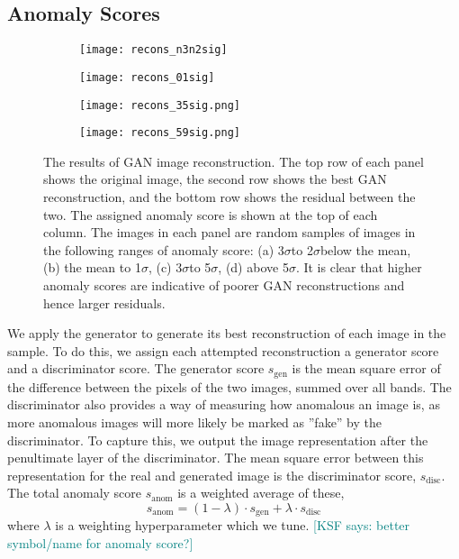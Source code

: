 \documentclass{article}
\newcommand{\sig}{$\sigma$} %
\newcommand{\KSF}[1]{\textcolor{teal}{{[KSF says: #1]}}}
\begin{document}
\subsection{Anomaly Scores}

\begin{figure}
\begin{subfigure}{.5\textwidth}
  \centering
  \texttt{[image: recons\_n3n2sig]}  
  \caption{}
  \label{fig:recon_neg}
\end{subfigure}
\begin{subfigure}{.5\textwidth}
  \centering
  \texttt{[image: recons\_01sig]}  
  \caption{}
  \label{fig:recon_mid}
\end{subfigure}

\begin{subfigure}{.5\textwidth}
  \centering
  \texttt{[image: recons\_35sig.png]}  
  \caption{}
  \label{fig:recon_3sig}
\end{subfigure}
\begin{subfigure}{.5\textwidth}
  \centering
  \texttt{[image: recons\_59sig.png]}  
  \caption{}
  \label{fig:recon_5sig}
\end{subfigure}
\caption{The results of GAN image reconstruction. The top row of each panel shows the original image, the second row shows the best GAN reconstruction, and the bottom row shows the residual between the two. The assigned anomaly score is shown at the top of each column. The images in each panel are random samples of images in the following ranges of anomaly score: (a) 3\sig to 2\sig below the mean, (b) the mean to 1\sig, (c) 3\sig to 5\sig, (d) above 5\sig. It is clear that higher anomaly scores are indicative of poorer GAN reconstructions and hence larger residuals.}
\label{fig:recon}
\end{figure}

We apply the generator to generate its best reconstruction of each image in the sample.
To do this, we assign each attempted reconstruction a generator score and a discriminator score.
The generator score $s_\mathrm{gen}$ is the mean square error of the difference between the pixels of the two images, summed over all bands.
The discriminator also provides a way of measuring how anomalous an image is, as more anomalous images will more likely be marked as ''fake'' by the discriminator.
To capture this, we output the image representation after the penultimate layer of the discriminator. %
The mean square error between this representation for the real and generated image is the discriminator score, $s_\mathrm{disc}$.
The total anomaly score $s_\mathrm{anom}$ is a weighted average of these,
\begin{equation}
s_\mathrm{anom} = (1-\lambda) \cdot s_\mathrm{gen} + \lambda \cdot s_\mathrm{disc} 
\end{equation}
where $\lambda$ is a weighting hyperparameter which we tune.
\KSF{better symbol/name for anomaly score?}
\end{document}
